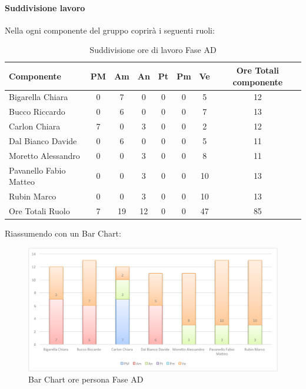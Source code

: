 			\paragraph{Suddivisione lavoro}
				Nella  ogni componente del gruppo \groupname{} coprirà i seguenti ruoli:
				\begin{table}[H]
					\begin{center}
						\begin{tabular}{| l | c | c | c | c | c | c | c |}
							\hline
							Componente 				& PM	& Am 	& An 	& Pt 		& Pm 	& Ve 	& Ore Totali componente \\ \hline
							
							Bigarella Chiara 			& 0		& 7 		& 0		& 0		& 0		& 5 		& 12 \\
							Bucco Riccardo 			& 0		& 6 		& 0		& 0		& 0		& 7 		& 13 \\
							Carlon Chiara	 			& 7 		& 0		& 3 		& 0		& 0		& 2 		& 12 \\
							Dal Bianco Davide 			& 0		& 6 		& 0		& 0		& 0		& 5 		& 11 \\
							Moretto Alessandro 			& 0		& 0		& 3 		& 0		& 0		& 8 		& 11 \\
							Pavanello Fabio Matteo	 	& 0		& 0		& 3 		& 0		& 0		& 10 		& 13 \\
							Rubin Marco				& 0		& 0		& 3 		& 0		& 0		& 10 		& 13 \\ \hline \hline
							
							Ore Totali Ruolo 			& 7 		& 19 		& 12 		& 0		& 0		& 47 		& 85\\ \hline
						\end{tabular}
					\end{center}
					\caption{Suddivisione ore di lavoro Fase AD}
				\end{table}
				Riassumendo con un Bar Chart:
				\begin{figure}[H]\centering
					\includegraphics[width=\textwidth]{PianoDiProgetto/Pics/ChartOreFaseAD.pdf}
					\caption{Bar Chart ore persona Fase AD}
				\end{figure}
